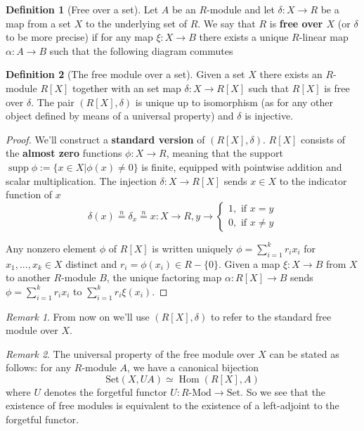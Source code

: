 \documentclass[a4paper,12pt,parskip=half*,chapterprefix=true,numbers=noendperiod]{scrreprt}
\newcommand{\opname}{\operatorname}
\theoremstyle{definition}
\newtheorem{definition}{Definition}[section]
\theoremstyle{remark}
\newtheorem*{remark}{Remark}
\begin{document}
\begin{definition}[Free over a set]
	Let $A$ be an $R$-module and let $\delta:X\to R$ be a map from a set $X$ to the underlying set of $R$. We say that $R$ is \textbf{free over $X$} (or $\delta$ to be more precise) if for any map $\xi:X\to B$ there exists a unique $R$-linear map $\alpha:A\to B$ such that the following diagram commutes
	\begin{figure}[H]
		\centering
	\end{figure}
\end{definition}

\begin{definition}[The free module over a set]
	Given a set $X$ there exists an $R$-module $R[X]$ together with an set map $\delta:X\to R[X]$ such that $R[X]$ is free over $\delta$. The pair $(R[X],\delta)$ is unique up to isomorphism (as for any other object defined by means of a universal property) and $\delta$ is injective.
\end{definition}
\begin{proof}
We'll construct a \textbf{standard version} of $(R[X],\delta)$. $R[X]$ consists of the \textbf{almost zero} functions $\phi:X\to R$, meaning that the support $\operatorname{supp}\phi:=\{x\in X|\phi(x)\neq 0\}$ is finite, equipped with pointwise addition and scalar multiplication. The injection $\delta:X\to R[X]$ sends $x\in X$ to the indicator function of $x$
\begin{equation*}
	\delta(x)\overset{n}{=}\delta_x\overset{n}{=}x:X\to R,y\to\begin{cases} 1,\text{ if }x=y\\
	0,\text{ if }x\neq y
	\end{cases}
\end{equation*}

Any nonzero element $\phi$ of $R[X]$ is written uniquely $\phi=\sum_{i=1}^kr_ix_i$ for $x_1,...,x_k\in X$ distinct and $r_i=\phi(x_i)\in R-\{0\}$. Given a map $\xi:X\to B$ from $X$ to another $R$-module $B$, the unique factoring map $\alpha:R[X]\to B$ sends $\phi=\sum_{i=1}^kr_ix_i$ to $\sum_{i=1}^kr_i\xi(x_i)$.
\end{proof}

\begin{remark}
	From now on we'll use $(R[X],\delta)$ to refer to the standard free module over $X$.
\end{remark}
\begin{remark}
	The universal property of the free module over $X$ can be stated as follows: for any $R$-module $A$, we have a canonical bijection
	\begin{equation*}
		\text{Set}(X,UA)\simeq\opname{Hom}(R[X],A)
	\end{equation*}
	where $U$ denotes the forgetful functor $U:R\text{-Mod}\to\text{Set}$. So we see that the existence of free modules is equivalent to the existence of a left-adjoint to the forgetful functor.
\end{remark}
\end{document}
